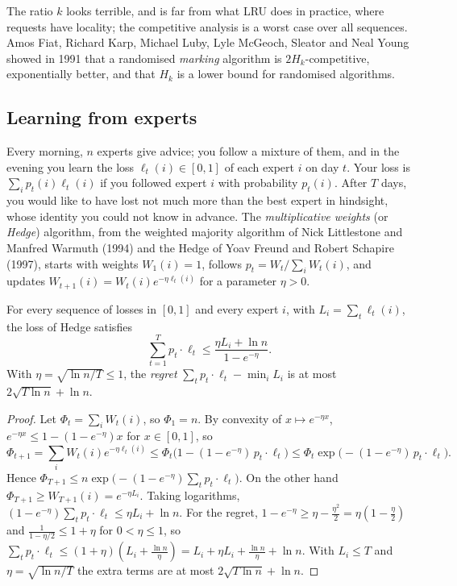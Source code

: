 The ratio $k$ looks terrible, and is far from what LRU does in practice, where requests have locality; the competitive analysis is a worst case over all sequences. Amos Fiat, Richard Karp, Michael Luby, Lyle McGeoch, Sleator and Neal Young showed in 1991 that a randomised \emph{marking} algorithm is $2H_k$-competitive, exponentially better, and that $H_k$ is a lower bound for randomised algorithms.

\subsection*{Learning from experts}

Every morning, $n$ experts give advice; you follow a mixture of them, and in the evening you learn the loss $\ell_t(i)\in[0,1]$ of each expert $i$ on day $t$. Your loss is $\sum_ip_t(i)\ell_t(i)$ if you followed expert $i$ with probability $p_t(i)$. After $T$ days, you would like to have lost not much more than the best expert in hindsight, whose identity you could not know in advance. The \emph{multiplicative weights} (or \emph{Hedge}) algorithm, from the weighted majority algorithm of Nick Littlestone and Manfred Warmuth (1994) and the Hedge of Yoav Freund and Robert Schapire (1997), starts with weights $W_1(i)=1$, follows $p_t=W_t/\sum_iW_t(i)$, and updates $W_{t+1}(i)=W_t(i)e^{-\eta\ell_t(i)}$ for a parameter $\eta>0$.

\begin{theorem}\label{thm:mw}
For every sequence of losses in $[0,1]$ and every expert $i$, with $L_i=\sum_t\ell_t(i)$, the loss of Hedge satisfies
\[
\sum_{t=1}^T p_t\cdot\ell_t\le\frac{\eta L_i+\ln n}{1-e^{-\eta}}.
\]
With $\eta=\sqrt{\ln n/T}\le1$, the \emph{regret} $\sum_tp_t\cdot\ell_t-\min_iL_i$ is at most $2\sqrt{T\ln n}+\ln n$.
\end{theorem}
\begin{proof}
Let $\Phi_t=\sum_iW_t(i)$, so $\Phi_1=n$. By convexity of $x\mapsto e^{-\eta x}$, $e^{-\eta x}\le1-(1-e^{-\eta})x$ for $x\in[0,1]$, so
\[
\Phi_{t+1}=\sum_iW_t(i)e^{-\eta\ell_t(i)}\le\Phi_t\bigl(1-(1-e^{-\eta})\,p_t\cdot\ell_t\bigr)\le\Phi_t\exp\bigl(-(1-e^{-\eta})\,p_t\cdot\ell_t\bigr).
\]
Hence $\Phi_{T+1}\le n\exp\bigl(-(1-e^{-\eta})\sum_tp_t\cdot\ell_t\bigr)$. On the other hand $\Phi_{T+1}\ge W_{T+1}(i)=e^{-\eta L_i}$. Taking logarithms, $(1-e^{-\eta})\sum_tp_t\cdot\ell_t\le\eta L_i+\ln n$.
For the regret, $1-e^{-\eta}\ge\eta-\frac{\eta^2}2=\eta(1-\frac\eta2)$ and $\frac1{1-\eta/2}\le1+\eta$ for $0<\eta\le1$, so $\sum_tp_t\cdot\ell_t\le(1+\eta)(L_i+\frac{\ln n}\eta)=L_i+\eta L_i+\frac{\ln n}\eta+\ln n$. With $L_i\le T$ and $\eta=\sqrt{\ln n/T}$ the extra terms are at most $2\sqrt{T\ln n}+\ln n$.
\end{proof}


